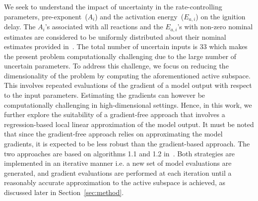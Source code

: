 We seek to understand the impact of uncertainty in the
rate-controlling parameters, pre-exponent~($A_i$) and the activation
energy~($E_{a,i}$) on the ignition delay. The $A_i$'s associated with all
reactions and the $E_{a,i}$'s with non-zero nominal estimates
are considered to be uniformly distributed about their nominal estimates provided
in~\cite{Yetter:1991}.  The total number of uncertain inputs is 33 which makes
the present problem computationally challenging due to the large number of 
uncertain parameters.  
To address this challenge, we focus on reducing the dimensionality
of the problem by computing the aforementioned active subspace.
This involves repeated evaluations of the gradient of a model output with
respect to the input parameters. Estimating the
gradients can however be computationally challenging in high-dimensional settings. 
Hence, in this work, we further explore the suitability of a gradient-free
approach that involves a regression-based local linear approximation of
the model output.  
It must be noted that since the gradient-free approach
relies on approximating the model gradients, it is expected to be less
robust than the gradient-based approach. The two approaches are based on
algorithms 1.1 and 1.2 in~\cite{Constantine:2015}. Both strategies
are implemented in an iterative manner i.e. a new set of model evaluations are
generated, and gradient evaluations are performed at each iteration until 
a reasonably accurate approximation to the active subspace is achieved, as
discussed later in Section~\ref{sec:method}. 

